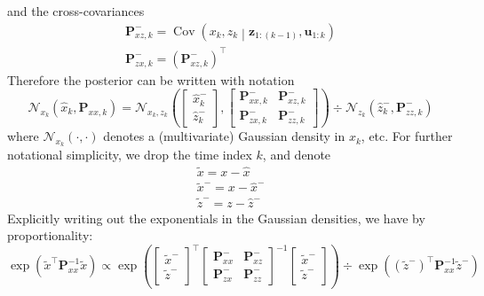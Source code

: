 \documentclass[11pt]{report} %
\begin{document}
and the cross-covariances
\begin{gather}
\mathbf{P}_{xz, k}^{-} = \operatorname{Cov}\left(x_{k}, z_{k}\middle|\mathbf{z}_{1:\left(k - 1\right)}, \mathbf{u}_{1:k}\right) \\
\mathbf{P}_{zx, k}^{-} = \left(\mathbf{P}_{xz, k}^{-}\right)^{\top}
\end{gather}
Therefore the posterior can be written with notation
\begin{equation}
\mathcal{N}_{x_{k}}\left(\hat{x}_{k}, \mathbf{P}_{xx, k}\right) = \mathcal{N}_{x_{k},z_{k}}\left(\begin{bmatrix} \hat{x}_{k}^{-} \\ \hat{z}_{k}^{-} \end{bmatrix}, \begin{bmatrix} \mathbf{P}_{xx, k}^{-} & \mathbf{P}_{xz, k}^{-} \\ \mathbf{P}_{zx, k}^{-} & \mathbf{P}_{zz, k}^{-} \end{bmatrix}\right) \div \mathcal{N}_{z_{k}}\left(\hat{z}_{k}^{-}, \mathbf{P}_{zz, k}^{-}\right)
\end{equation}
where $\mathcal{N}_{x_{k}}\left(\cdot, \cdot\right)$ denotes a (multivariate) Gaussian density in $x_{k}$, etc. For further notational simplicity, we drop the time index $k$, and denote
\begin{gather}
\widetilde{x} = x - \hat{x} \\
\widetilde{x}^{-} = x - \hat{x}^{-} \\
\widetilde{z}^{-} = z - \hat{z}^{-}
\end{gather}
Explicitly writing out the exponentials in the Gaussian densities, we have by proportionality:
\begin{equation}
\exp\left(\widetilde{x}^{\top}\mathbf{P}_{xx}^{-1}\widetilde{x}\right) \propto \exp\left(\begin{bmatrix}\widetilde{x}^{-} \\ \widetilde{z}^{-}\end{bmatrix}^{\top}\begin{bmatrix} \mathbf{P}_{xx}^{-} & \mathbf{P}_{xz}^{-} \\ \mathbf{P}_{zx}^{-} & \mathbf{P}_{zz}^{-} \end{bmatrix}^{-1}\begin{bmatrix}\widetilde{x}^{-} \\ \widetilde{z}^{-}\end{bmatrix}\right) \div \exp\left(\left(\widetilde{z}^{-}\right)^{\top}\mathbf{P}_{xx}^{-1}\widetilde{z}^{-}\right)
\end{equation}
\end{document}
